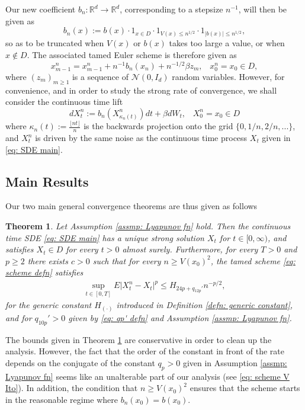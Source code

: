 \documentclass{article}
\newtheorem{thm}{Theorem}
\begin{document}
Our new coefficient $b_n:\mathbb{R}^d\to\mathbb{R}^d$, corresponding to a stepsize $n^{-1}$, will then be given as
\begin{equation}\label{eq: truncated coef}
b_n(x):=b(x)\cdot 1_{x\in D}\cdot 1_{V(x)\leq n^{1/2}}\cdot 1_{\lvert b(x)\rvert \leq n^{1/2}},
    \end{equation}
so as to be truncated when $V(x)$ or $b(x)$ takes too large a value, or when $x\not \in D$. The associated tamed Euler scheme is therefore given as
\begin{equation}\label{eq: tamed discrete}
   x^n_{m-1}=x^n_{m-1}+n^{-1}b_n(x_n)+n^{-1/2}\beta z_m, \;\;\;x^n_0=x_0\in D,
\end{equation}
where $(z_m)_{m\geq 1}$ is a sequence of $\mathcal{N}(0,I_d)$ random variables. However, for convenience, and in order to study the strong rate of convergence, we shall consider the continuous time lift \begin{equation}\label{eq: scheme defn}
      dX^n_t:=b_n(X^n_{\kappa_n(t)})dt+\beta dW_t,\;\;\; X^n_0=x_0\in D
    \end{equation}
     where $\kappa_n(t):=\frac{\lfloor nt\rfloor}{n}$ is the backwards projection onto the grid $\{0,1/n,2/n,...\}$, and $X^n_t$ is driven by the same noise as the continuous time process $X_t$ given in \eqref{eq: SDE main}.
     \subsection{Main Results}
     Our two main general convergence theorems are thus given as follows
     \begin{thm}\label{thm: conv of scheme}
        Let Assumption \ref{assmp: Lyapunov fn} hold. Then the continuous time SDE \eqref{eq: SDE main} has a unique strong solution $X_t$ for $t\in[0,\infty)$, and satisfies $X_t\in D$ for every $t>0$ almost surely. Furthermore, for every $T>0$ and $p\geq2$ there exists $c>0$ such that for every $n \geq V(x_0)^2$, the tamed scheme \eqref{eq: scheme defn} satisfies 
         \begin{align}
       \sup_{t\in [0,T]} E\lvert X^n_t-X_t\rvert^p \leq H_{24p+q_{12p}'}n^{-p/2},
    \end{align}
        for the generic constant $H_{(\cdot)}$ introduced in Definition \ref{defn: generic constant}, and for $q_{10p}'>0$ given by 
        \eqref{eq: qp' defn} and Assumption \ref{assmp: Lyapunov fn}.
     \end{thm}
     The bounds given in Theorem \ref{thm: conv of scheme} are conservative in order to clean up the analysis. However, the fact that the order of the constant in front of the rate depends on the conjugate of the constant $q_p>0$ given in Assumption \ref{assmp: Lyapunov fn} seems like an unalterable part of our analysis (see \eqref{eq: scheme V Ito}). In addition, the condition that $n \geq V(x_0)^2$ ensures that the scheme starts in the reasonable regime where $b_n(x_0)=b(x_0)$. 
\end{document}

